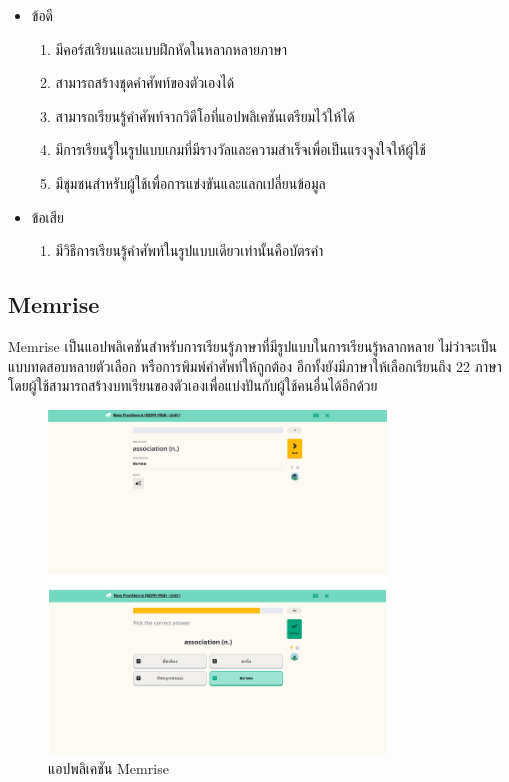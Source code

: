 \documentclass[12pt,oneside,openright,a4paper]{cpe-thai-project}
\begin{document}
\begin{itemize}
	\item ข้อดี
	      \begin{enumerate}
		      \item มีคอร์สเรียนและแบบฝึกหัดในหลากหลายภาษา
		      \item สามารถสร้างชุดคำศัพท์ของตัวเองได้
		      \item สามารถเรียนรู้คำศัพท์จากวิดีโอที่แอปพลิเคชันเตรียมไว้ให้ได้
		      \item มีการเรียนรู้ในรูปแบบเกมที่มีรางวัลและความสำเร็จเพื่อเป็นแรงจูงใจให้ผู้ใช้
		      \item มีชุมชนสำหรับผู้ใช้เพื่อการแข่งขันและแลกเปลี่ยนข้อมูล
	      \end{enumerate}
	\item ข้อเสีย
	      \begin{enumerate}
		      \item มีวิธีการเรียนรู้คำศัพท์ในรูปแบบเดียวเท่านั้นคือบัตรคำ
	      \end{enumerate}
\end{itemize}

\pagebreak
\subsection{Memrise \cite{Memrise}}

\hspace{1cm}
Memrise เป็นแอปพลิเคชันสำหรับการเรียนรู้ภาษาที่มีรูปแบบในการเรียนรู้หลากหลาย ไม่ว่าจะเป็นแบบทดสอบหลายตัวเลือก
หรือการพิมพ์คำศัพท์ให้ถูกต้อง อีกทั้งยังมีภาษาให้เลือกเรียนถึง 22 ภาษา โดยผู้ใช้สามารถสร้างบทเรียนของตัวเองเพื่อแบ่งปันกับผู้ใช้คนอื่นได้อีกด้วย

\begin{figure}[!h]\centering
	\includegraphics[width=0.8\textwidth, keepaspectratio=true]{image/chap2/memriseEX.png}
	\caption{แอปพลิเคชัน Memrise}\label{fig:mimriseEx}
\end{figure}
\end{document}
